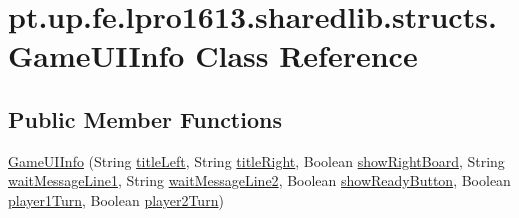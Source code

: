 \hypertarget{classpt_1_1up_1_1fe_1_1lpro1613_1_1sharedlib_1_1structs_1_1_game_u_i_info}{}\section{pt.\+up.\+fe.\+lpro1613.\+sharedlib.\+structs.\+Game\+U\+I\+Info Class Reference}
\label{classpt_1_1up_1_1fe_1_1lpro1613_1_1sharedlib_1_1structs_1_1_game_u_i_info}
\subsection*{Public Member Functions}
\begin{DoxyCompactItemize}
\item 
\hyperlink{classpt_1_1up_1_1fe_1_1lpro1613_1_1sharedlib_1_1structs_1_1_game_u_i_info_a150aca8387fa441d0c3983ae718e79ef}{Game\+U\+I\+Info} (String \hyperlink{classpt_1_1up_1_1fe_1_1lpro1613_1_1sharedlib_1_1structs_1_1_game_u_i_info_a798fd7d7503ee81e37866d82d02705ee}{title\+Left}, String \hyperlink{classpt_1_1up_1_1fe_1_1lpro1613_1_1sharedlib_1_1structs_1_1_game_u_i_info_a335b692f6aa35df7e3489f5e20b2cade}{title\+Right}, Boolean \hyperlink{classpt_1_1up_1_1fe_1_1lpro1613_1_1sharedlib_1_1structs_1_1_game_u_i_info_a20d8a3eadd649476b4a7aa3f9b7d7f57}{show\+Right\+Board}, String \hyperlink{classpt_1_1up_1_1fe_1_1lpro1613_1_1sharedlib_1_1structs_1_1_game_u_i_info_aeae3b5efead23d6a6aa373738460fba2}{wait\+Message\+Line1}, String \hyperlink{classpt_1_1up_1_1fe_1_1lpro1613_1_1sharedlib_1_1structs_1_1_game_u_i_info_a15c062eb1e6fd3a80cfa706f2e786522}{wait\+Message\+Line2}, Boolean \hyperlink{classpt_1_1up_1_1fe_1_1lpro1613_1_1sharedlib_1_1structs_1_1_game_u_i_info_a576914a206905929c654271f00c936b8}{show\+Ready\+Button}, Boolean \hyperlink{classpt_1_1up_1_1fe_1_1lpro1613_1_1sharedlib_1_1structs_1_1_game_u_i_info_a157213d6fe17796f0dccb85bf2aba49d}{player1\+Turn}, Boolean \hyperlink{classpt_1_1up_1_1fe_1_1lpro1613_1_1sharedlib_1_1structs_1_1_game_u_i_info_ad206089fbb83e13c0943a8c515638b7e}{player2\+Turn})
\end{DoxyCompactItemize}

